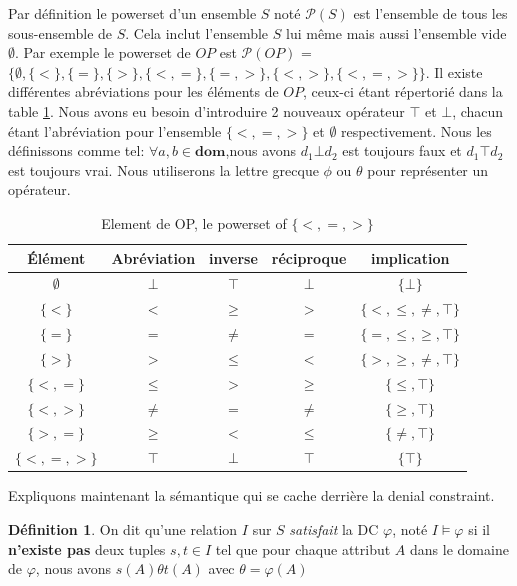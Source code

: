 \documentclass[letterpaper, 12pt]{report}
\theoremstyle{definition}
\newtheorem{mydef}{Définition}
\begin{document}
Par définition le powerset d'un ensemble $S$ noté $\mathcal{P}(S)$ est l'ensemble de tous les sous-ensemble de $S$. Cela inclut l'ensemble $S$ lui même mais aussi l'ensemble vide $\emptyset$. Par exemple le powerset de $OP$ est $\mathcal{P}(OP)$ = $\{ \emptyset, \{<\} , \{=\}, \{>\}, \{<,=\}, \{=,>\}, \{<,>\}, \{<,=,>\} \}$. Il existe différentes abréviations pour les éléments de $OP$, ceux-ci étant répertorié dans la table \ref{operatorTable}. Nous avons eu besoin d'introduire 2 nouveaux opérateur $\top$ et $\bot$, chacun étant l'abréviation pour l'ensemble $\{<,=,>\}$ et $\emptyset$ respectivement. Nous les définissons comme tel: $ \forall a,b \in \mathbf{dom}$,nous avons $d_1 \bot d_2$ est toujours faux et $d_1 \top d_2$ est toujours vrai. Nous utiliserons la lettre grecque $\phi$ ou $\theta$ pour représenter un opérateur.\\

\begin{table}
	\begin{center}
	\begin{tabular}{|c|c|c|c|c|}\hline
	Élément & Abréviation & inverse & réciproque & implication\\\hline\hline
	$\emptyset$ & $\bot$ & $\top$ & $\bot$ & $\{\bot\}$\\\hline
	$\{<\}$     & $<$ & $\geq$ & $>$ & $\{<,\leq,\neq, \top \}$\\\hline
	$\{=\}$     & $=$ & $\neq$ & $=$ & $\{=,\leq,\geq, \top \}$\\\hline
	$\{>\}$     & $>$ & $\leq$ & $<$ & $\{ >,\geq,\neq,\top \}$\\\hline 
	$\{<,=\}$   & $\leq$ & $>$ & $\geq$ & $\{\leq, \top \}$\\\hline 
	$\{<,>\}$   & $\neq$ & $=$ & $\neq$ & $\{\geq, \top \}$\\\hline
	$\{>,=\}$   & $\geq$ & $<$& $\leq$ & $\{\neq, \top \}$\\\hline 
	$\{<,=,>\}$ & $\top$ & $\bot$ & $\top$ & $\{\top \}$\\\hline
	\end{tabular}
	\end{center}
	\caption{Element de OP, le powerset of $\{ <,=,>\}$ \label{operatorTable}}
\end{table}

Expliquons maintenant la sémantique qui se cache derrière la denial constraint.

\begin{mydef}
On dit qu'une relation $I$ sur $S$ \emph{satisfait} la DC $\varphi$, noté $I \models \varphi$ si il \textbf{n'existe pas} deux tuples $s,t \in I$ tel que pour chaque attribut $A$ dans le domaine de $\varphi$, nous avons $s(A)\theta t(A)$ avec $\theta =  \varphi(A)$ 
\end{mydef}
\end{document}
